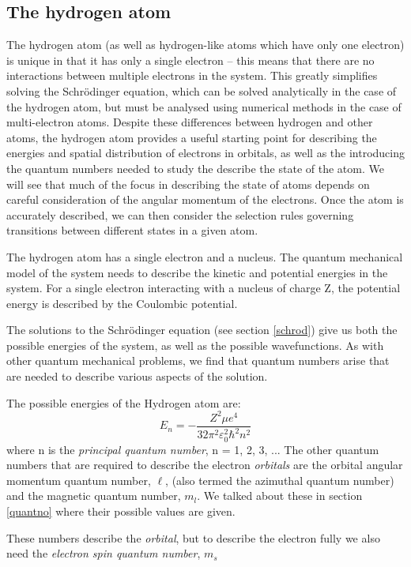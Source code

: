 \documentclass[a4paper,titlepage]{article}
\begin{document}
\subsection{The hydrogen atom}

The hydrogen atom (as well as hydrogen-like atoms which have only one electron) is
unique in that it has only a single electron – this means that there are no interactions
between multiple electrons in the system. This greatly simplifies solving the Schrödinger
equation, which can be solved analytically in the case of the hydrogen atom, but must be
analysed using numerical methods in the case of multi-electron atoms. Despite these
differences between hydrogen and other atoms, the hydrogen atom provides a useful
starting point for describing the energies and spatial distribution of electrons in orbitals,
as well as the introducing the quantum numbers needed to study the describe the state of
the atom. We will see that much of the focus in describing the state of atoms depends on
careful consideration of the angular momentum of the electrons. Once the atom is
accurately described, we can then consider the selection rules governing transitions
between different states in a given atom.

The hydrogen atom has a single electron and a nucleus. The quantum mechanical model
of the system needs to describe the kinetic and potential energies in the system. For a
single electron interacting with a nucleus of charge Z, the potential energy is described by
the Coulombic potential.


The solutions to the Schrödinger equation (see section \ref{schrod}) give us both the possible energies of the
system, as well as the possible wavefunctions. As with other quantum mechanical
problems, we find that quantum numbers arise that are needed to describe various aspects
of the solution.\newline

\medskip The possible energies of the Hydrogen atom are:
\[E_n = -\frac{Z^2\mu e^4}{32\pi^2\varepsilon^2_0\hbar^2n^2}\]
\medskip where n is the \textit{principal quantum number}, n = 1, 2, 3, ...
The other quantum numbers that are required to describe the electron \textit{orbitals} are the orbital angular momentum quantum number, \(\ell\), (also termed the azimuthal quantum number) and the magnetic quantum number, \(m_l\). We talked about these in section \ref{quantno} where their possible values are given.

These numbers describe the \textit{orbital}, but to describe the electron fully we also need the \textit{electron spin quantum number}, \(m_s\)
\end{document}
